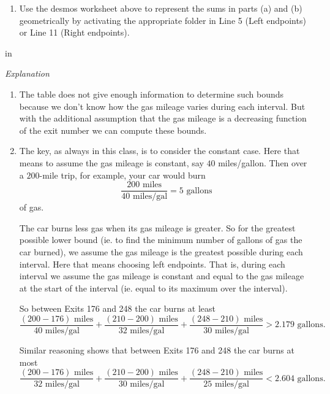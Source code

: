 \documentclass{ximera}
\newcommand{\pskip}{\vskip 0.1 in}
\begin{document}
\begin{exercise}
\begin{enumerate}
\item Use the desmos worksheet above to represent the sums in parts (a) and (b) geometrically by activating the appropriate folder in Line 5 (Left endpoints) or Line 11 (Right endpoints).  %
\end{enumerate}


\pskip 

\emph{Explanation}

\begin{enumerate}
\item The table does not give enough information to determine such bounds because we don't know how the gas mileage varies during each interval. But with the additional assumption that the gas mileage is a decreasing function of the exit number we can compute these bounds.

\item The key, as always in this class, is to consider the constant case. Here that means to assume the gas mileage is constant, say $40$ miles/gallon. Then over a $200$-mile trip, for example, your car would burn
\[
      \frac{200 \text{ miles}}{40 \text{ miles/gal}} = 5\text{ gallons}
\]
of gas. 

The car burns less gas when its gas mileage is greater. So for the greatest possible lower bound (ie. to find the minimum number of gallons of gas the car burned), we assume the gas mileage is the greatest possible during each interval. Here that means choosing left endpoints. That is, during each interval we assume the gas mileage is constant and equal to the gas mileage at the start of the interval (ie. equal to its maximum over the interval).

So between Exits 176 and 248 the car burns at least
\[
   \frac{(200-176) \text{ miles}}{40 \text{ miles/gal}} +  \frac{(210 - 200) \text{ miles}}{32 \text{ miles/gal}} + \frac{(248 - 210) \text{ miles}}{30 \text{ miles/gal}} > 2.179 \text{ gallons}.
\] 

Similar reasoning shows that between Exits 176 and 248 the car burns at most
\[
   \frac{(200-176) \text{ miles}}{32 \text{ miles/gal}} +  \frac{(210 - 200) \text{ miles}}{30 \text{ miles/gal}} + \frac{(248 - 210) \text{ miles}}{25 \text{ miles/gal}} < 2.604 \text{ gallons}.
\] 

\end{enumerate}



\end{exercise}
\end{document}
